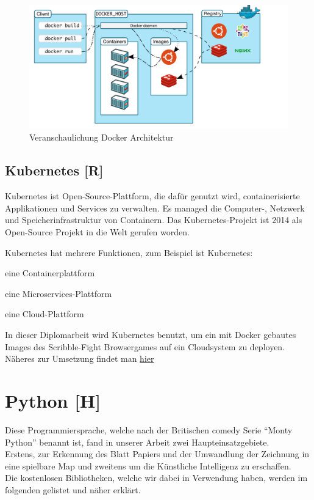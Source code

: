 \begin{figure}[H]
    \centering
    \includegraphics[scale=0.6]{pics/docker architecture.PNG}
    \caption{Veranschaulichung Docker Architektur}
\end{figure}


\subsection{Kubernetes [R]}
Kubernetes ist Open-Source-Plattform, die dafür genutzt wird, containerisierte Applikationen und Services zu verwalten. Es managed die Computer-, Netzwerk und Speicherinfrastruktur von Containern.
Das Kubernetes-Projekt ist 2014 als Open-Source Projekt in die Welt gerufen worden.

Kubernetes hat mehrere Funktionen, zum Beispiel ist Kubernetes:
\begin{compactitem}
    \item eine Containerplattform
    \item eine Microservices-Plattform
    \item eine Cloud-Plattform
\end{compactitem}

In dieser Diplomarbeit wird Kubernetes benutzt, um ein mit Docker gebautes Images des Scribble-Fight Browsergames auf ein Cloudsystem zu deployen. Näheres zur Umsetzung findet man \url{hier}

\newpage
\section{Python [H]}
Diese Programmiersprache, welche nach der Britischen comedy Serie ``Monty Python'' benannt ist,
fand in unserer Arbeit zwei Haupteinsatzgebiete. \\
Erstens, zur Erkennung des Blatt Papiers und der Umwandlung der Zeichnung in eine spielbare Map
und zweitens um die Künstliche Intelligenz zu erschaffen. \\
Die kostenlosen Bibliotheken, welche wir dabei in Verwendung haben, werden im folgenden gelistet und näher
erklärt.

